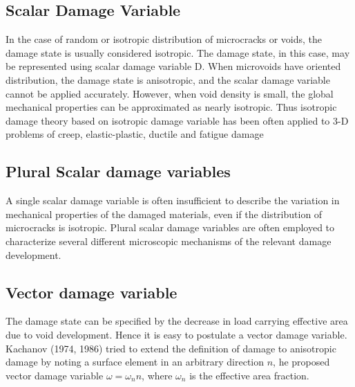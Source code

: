 \documentclass[a4paper,12pt,twoside]{report}
\begin{document}
\subsection{Scalar Damage Variable}
\indent\indent\indent In the case of random or isotropic distribution of microcracks or voids, the damage state is usually considered isotropic. The damage state, in this case, may be represented using scalar damage variable D. When microvoids have oriented distribution, the damage state is anisotropic, and the scalar damage variable cannot be applied accurately. However, when void density is small, the global mechanical properties can be approximated as nearly isotropic. Thus isotropic damage theory based on isotropic damage variable has been often applied to 3-D problems of creep, elastic-plastic, ductile and fatigue damage
\subsection{Plural Scalar damage variables}
\indent\indent\indent A single scalar damage variable is often insufficient to describe the variation in mechanical properties of the damaged materials, even if the distribution of microcracks is isotropic. Plural scalar damage variables are often employed to characterize several different microscopic mechanisms of the relevant damage development.
\subsection{Vector damage variable}
\indent\indent\indent The damage state can be specified by the decrease in load carrying effective area due to void development. Hence it is easy to postulate a vector damage variable. Kachanov (1974, 1986) tried to extend the definition of damage to anisotropic damage by noting a surface element in an arbitrary direction $n$, he proposed vector damage variable $ \omega = \omega_{n}n$, where $\omega_{n}$ is the effective area fraction. 
\end{document}
